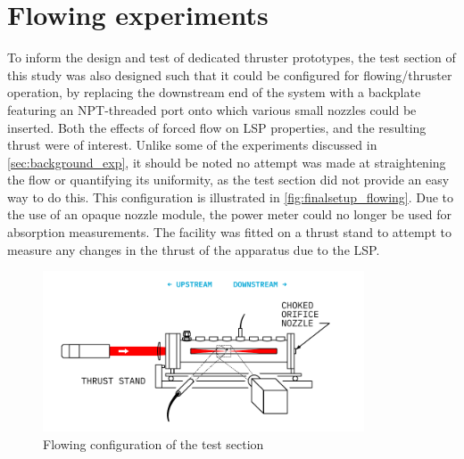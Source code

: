     \section{Flowing experiments} \label{sec:exp_flowing}
        To inform the design and test of dedicated thruster prototypes, the test section of this study was also designed such that it could be configured for flowing/thruster operation, by replacing the downstream end of the system with a backplate featuring an NPT-threaded port onto which various small nozzles could be inserted. Both the effects of forced flow on LSP properties, and the resulting thrust were of interest. Unlike some of the experiments discussed in \autoref{sec:background_exp}, it should be noted no attempt was made at straightening the flow or quantifying its uniformity, as the test section did not provide an easy way to do this. This configuration is illustrated in \autoref{fig:finalsetup_flowing}. Due to the use of an opaque nozzle module, the power meter could no longer be used for absorption measurements. The facility was fitted on a thrust stand to attempt to measure any changes in the thrust of the apparatus due to the LSP.

        \begin{figure}[h]
            \centering
            \includegraphics[width=0.85\textwidth]{assets/5 results/finalsetup_flowing}
            \caption{Flowing configuration of the test section}
            \label{fig:finalsetup_flowing}
        \end{figure}

